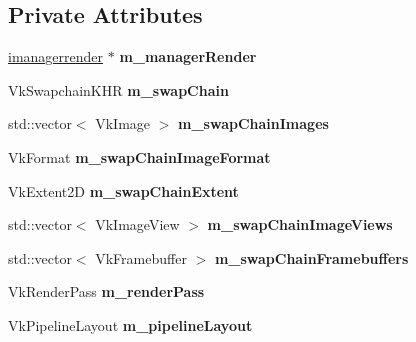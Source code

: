 \subsection*{Private Attributes}
\begin{DoxyCompactItemize}
\item 
\mbox{\label{classflounder_1_1renderer_a17f5e7df9b76e7a19dd66df39dd7ac10}} 
\hyperlink{classflounder_1_1imanagerrender}{imanagerrender} $\ast$ {\bfseries m\+\_\+manager\+Render}
\item 
\mbox{\label{classflounder_1_1renderer_afe2f684e68953142a4994183cbd5520c}} 
Vk\+Swapchain\+K\+HR {\bfseries m\+\_\+swap\+Chain}
\item 
\mbox{\label{classflounder_1_1renderer_a58fc3f685d0b10fc064621eba8f21e2b}} 
std\+::vector$<$ Vk\+Image $>$ {\bfseries m\+\_\+swap\+Chain\+Images}
\item 
\mbox{\label{classflounder_1_1renderer_a717ea7edd418929f473e3ca28278fb8b}} 
Vk\+Format {\bfseries m\+\_\+swap\+Chain\+Image\+Format}
\item 
\mbox{\label{classflounder_1_1renderer_aa64e56a5cac82dfac6fda89b42c87e99}} 
Vk\+Extent2D {\bfseries m\+\_\+swap\+Chain\+Extent}
\item 
\mbox{\label{classflounder_1_1renderer_afc09b6c8f808da658b1e9e575c530e0c}} 
std\+::vector$<$ Vk\+Image\+View $>$ {\bfseries m\+\_\+swap\+Chain\+Image\+Views}
\item 
\mbox{\label{classflounder_1_1renderer_afa2f6ecd01e719dce14bb50623c8be43}} 
std\+::vector$<$ Vk\+Framebuffer $>$ {\bfseries m\+\_\+swap\+Chain\+Framebuffers}
\item 
\mbox{\label{classflounder_1_1renderer_a6e9db61b244fcdaed047cab69904bc15}} 
Vk\+Render\+Pass {\bfseries m\+\_\+render\+Pass}
\item 
\mbox{\label{classflounder_1_1renderer_af4aa006ee54572d1b6793f3144a5a09b}} 
Vk\+Pipeline\+Layout {\bfseries m\+\_\+pipeline\+Layout}

\end{DoxyCompactItemize}
